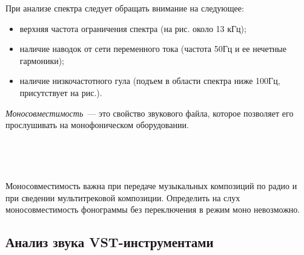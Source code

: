 \documentclass{beamer}
\begin{document}
\begin{frame}

При анализе спектра следует обращать внимание на следующее:
\begin{itemize}
\item верхняя частота ограничения спектра (на рис. около 13 кГц);
\item наличие наводок от сети переменного тока (частота 50Гц и ее нечетные гармоники);
\item наличие низкочастотного гула (подъем в области спектра ниже 100Гц, присутствует на рис.).
\end{itemize}
\end{frame}

\begin{frame}
\textit{Моносовместимость}~--- это свойство звукового файла, которое позволяет его прослушивать на монофоническом оборудовании. 

~


~

Моносовместимость важна при передаче музыкальных композиций по радио и при сведении мультитрековой композиции. Определить на слух моносовместимость фонограммы без переключения в режим моно невозможно. 
\end{frame}

\subsection{Анализ звука VST-инструментами}
\end{document}
